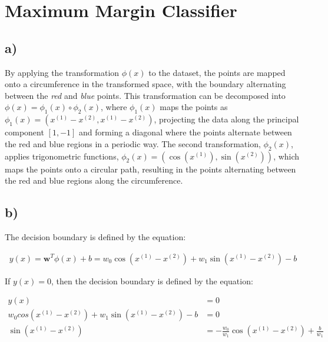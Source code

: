\documentclass[12pt,a4paper,oneside]{paper}
\begin{document}
\pagestyle{plain}


\def\title {Homework Assignment 4}

 
\cleardoublepage
{}\selectfont
\setcounter{page}{0}
\tableofcontents
\newpage

\small

\section{Maximum Margin Classifier}

\subsection*{a)}

By applying the transformation $\phi(x)$ to the dataset, the points are mapped onto a circumference in the transformed
space, with the boundary alternating between the \textit{red} and \textit{blue} points. This transformation can be
decomposed into $\phi(x) = \phi_1(x) \circ \phi_2(x)$, where $\phi_1(x)$ maps the points as $\phi_1(x) = (x^{(1)} - x^{(2)}, x^{(1)} - x^{(2)})$,
projecting the data along the principal component $[1, -1]$ and forming a diagonal where the points alternate between
the red and blue regions in a periodic way. The second transformation, $\phi_2(x)$, applies trigonometric functions,
$\phi_2(x) = (\cos(x^{(1)}), \sin(x^{(2)}))$, which maps the points onto a circular path, resulting in the points
alternating between the red and blue regions along the circumference.

\newpage
\subsection*{b)}

The decision boundary is defined by the equation:

\begin{align*}
    y(x) = \bm{w}^T \phi(x) + b = w_0 \cos(x^{(1)} - x^{(2)}) + w_1 \sin(x^{(1)} - x^{(2)}) - b
\end{align*}

If $y(x) = 0$, then the decision boundary is defined by the equation:

\begin{align*}
    y(x) &= 0 \\
    w_0 cos(x^{(1)} - x^{(2)}) + w_1 \sin(x^{(1)} - x^{(2)}) - b &= 0 \\
    \sin(x^{(1)} - x^{(2)}) &= -\frac{w_0}{w_1} \cos(x^{(1)} - x^{(2)}) + \frac{b}{w_1} \\
\end{align*}
\end{document}

